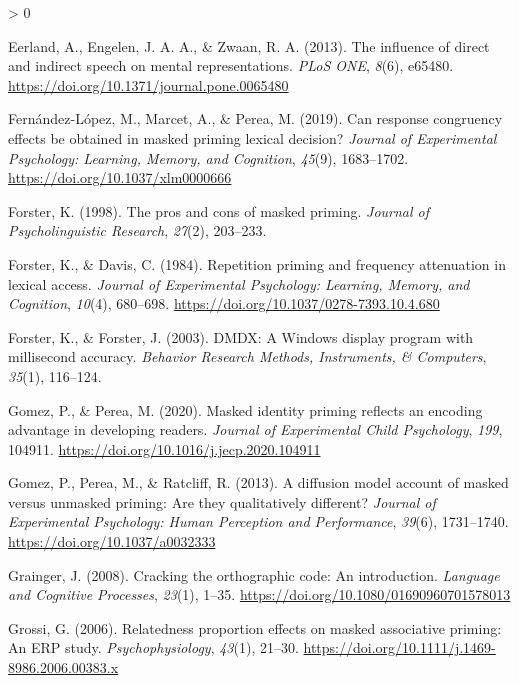 \documentclass[
  english,
  man,floatsintext]{apa6}
\newlength{\cslhangindent}
\newenvironment{CSLReferences}[2] %
 {%
  \setlength{\parindent}{0pt}
  \ifodd #1 \everypar{\setlength{\hangindent}{\cslhangindent}}\ignorespaces\fi
  \ifnum #2 > 0
  \setlength{\parskip}{#2\baselineskip}
  \fi
 }%
 {}
\begin{document}
\begin{CSLReferences}{1}{0}
\leavevmode\hypertarget{ref-eerland2013influence}{}%
Eerland, A., Engelen, J. A. A., \& Zwaan, R. A. (2013). The influence of direct and indirect speech on mental representations. \emph{{PLoS} {ONE}}, \emph{8}(6), e65480. \url{https://doi.org/10.1371/journal.pone.0065480}

\leavevmode\hypertarget{ref-Fern_ndez_L_pez_2019}{}%
Fernández-López, M., Marcet, A., \& Perea, M. (2019). Can response congruency effects be obtained in masked priming lexical decision? \emph{Journal of Experimental Psychology: Learning, Memory, and Cognition}, \emph{45}(9), 1683--1702. \url{https://doi.org/10.1037/xlm0000666}

\leavevmode\hypertarget{ref-forster1998pros}{}%
Forster, K. (1998). The pros and cons of masked priming. \emph{Journal of Psycholinguistic Research}, \emph{27}(2), 203--233.

\leavevmode\hypertarget{ref-forsterRepetitionPrimingFrequency1984}{}%
Forster, K., \& Davis, C. (1984). Repetition priming and frequency attenuation in lexical access. \emph{Journal of Experimental Psychology: Learning, Memory, and Cognition}, \emph{10}(4), 680--698. \url{https://doi.org/10.1037/0278-7393.10.4.680}

\leavevmode\hypertarget{ref-forsterDMDXWindowsDisplay2003}{}%
Forster, K., \& Forster, J. (2003). {DMDX}: {A Windows} display program with millisecond accuracy. \emph{Behavior Research Methods, Instruments, \& Computers}, \emph{35}(1), 116--124.

\leavevmode\hypertarget{ref-Gomez_2020}{}%
Gomez, P., \& Perea, M. (2020). Masked identity priming reflects an encoding advantage in developing readers. \emph{Journal of Experimental Child Psychology}, \emph{199}, 104911. \url{https://doi.org/10.1016/j.jecp.2020.104911}

\leavevmode\hypertarget{ref-gomezDiffusionModelAccount2013}{}%
Gomez, P., Perea, M., \& Ratcliff, R. (2013). A diffusion model account of masked versus unmasked priming: {Are} they qualitatively different? \emph{Journal of Experimental Psychology: Human Perception and Performance}, \emph{39}(6), 1731--1740. \url{https://doi.org/10.1037/a0032333}

\leavevmode\hypertarget{ref-grainger2008cracking}{}%
Grainger, J. (2008). Cracking the orthographic code: An introduction. \emph{Language and Cognitive Processes}, \emph{23}(1), 1--35. \url{https://doi.org/10.1080/01690960701578013}

\leavevmode\hypertarget{ref-grossi2006relatedness}{}%
Grossi, G. (2006). Relatedness proportion effects on masked associative priming: An {ERP} study. \emph{Psychophysiology}, \emph{43}(1), 21--30. \url{https://doi.org/10.1111/j.1469-8986.2006.00383.x}


\end{CSLReferences}
\end{document}
